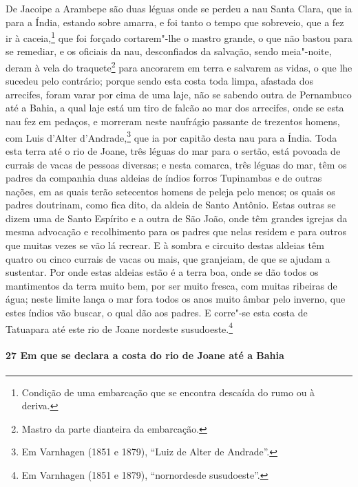 De Jacoipe a Arambepe são duas léguas onde se perdeu a nau Santa Clara, que ia para a
Índia, estando sobre amarra, e foi tanto o tempo que sobreveio, que a fez ir à
caceia,\footnote{ Condição de uma embarcação que se encontra descaída do rumo ou à
deriva.} que foi forçado cortarem"-lhe o mastro grande, o que não bastou para se remediar,
e os oficiais da nau, desconfiados da salvação, sendo meia"-noite, deram à vela do
traquete\footnote{ Mastro da parte dianteira da embarcação.} para
ancorarem em terra e salvarem as vidas, o que lhe sucedeu pelo contrário; porque sendo
esta costa toda limpa, afastada dos arrecifes, foram varar por cima de uma laje, não se
sabendo outra de Pernambuco até a Bahia, a qual laje está um tiro de falcão ao mar dos
arrecifes, onde se esta nau fez em pedaços, e morreram neste naufrágio passante
de  trezentos homens, com Luis d'Alter d'Andrade,\footnote{ Em Varnhagen (1851 e
1879), ``Luiz de Alter de Andrade''.} que ia por capitão desta nau para a Índia. Toda esta
terra até o rio de Joane, três léguas do mar para o sertão, está povoada de currais de
vacas de pessoas diversas; e nesta comarca, três léguas do mar, têm os padres da companhia
duas aldeias de índios forros Tupinambas e de outras nações, em as quais terão setecentos
homens de peleja pelo menos; os quais os padres doutrinam, como fica dito, da aldeia de
Santo Antônio. Estas outras se dizem uma de Santo Espírito e a outra de São João, onde têm
grandes igrejas da mesma advocação e recolhimento para os padres que nelas residem e para
outros que muitas vezes se vão lá recrear. E à sombra e circuito destas aldeias têm quatro
ou cinco currais de vacas ou mais, que granjeiam, de que se ajudam a sustentar. Por onde
estas aldeias estão é a terra boa, onde se dão todos os mantimentos da terra muito bem,
por ser muito fresca, com muitas ribeiras de água; neste limite lança o mar fora todos os
anos muito âmbar pelo inverno, que estes índios vão buscar, o qual dão aos padres. E
corre"-se esta costa de Tatuapara até este rio de Joane nordeste susudoeste.\footnote{ Em
Varnhagen (1851 e 1879), ``nornordesde susudoeste''.}

\paragraph{27 Em que se declara a costa do rio de Joane até a Bahia}

